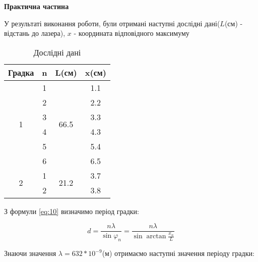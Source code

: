 \begin{center}
    \Large{\textbf{Практична частина}}
\end{center}

\vspace{1mm}

У результаті виконання роботи, були отримані наступні дослідні дані($L$(см) - відстань до лазера),
$x$ - координата відповідного максимуму

\begin{table}[h!]
    \centering
    \begin{tabular}{|c|c|c|c|}
        \hline
        \textbf{Градка} & \textbf{n} & \textbf{L(см)} & \textbf{x(см)} \\        
        \hline
        \multirow{6}{*}{1} & 1 & \multirow{6}{*}{66.5} & 1.1 \\
        \cline{2-2} \cline{4-4}
         & 2 &  & 2.2 \\
        \cline{2-2} \cline{4-4}
         & 3 &  & 3.3 \\
        \cline{2-2} \cline{4-4}
        & 4 &  & 4.3 \\
        \cline{2-2} \cline{4-4}
        & 5 &  & 5.4 \\
        \cline{2-2} \cline{4-4}
        & 6 &  & 6.5 \\
        \hline

        
        \multirow{2}{*}{2} & 1 & \multirow{2}{*}{21.2} & 3.7 \\        
        \cline{2-2} \cline{4-4}
        & 2 &  & 3.8 \\
        \hline
    \end{tabular}

    \caption{Дослідні дані}
\end{table}

З формули \ref{eq:10} визначимо період градки:

$$ d = \frac{n \lambda}{\sin{\varphi_n}} = \frac{n \lambda}{\sin{\arctan{\frac{x_n}{L}}}} $$

Знаючи значення $\lambda = 632*10^{-9}$(м) отримаємо наступні значення періоду градки:

